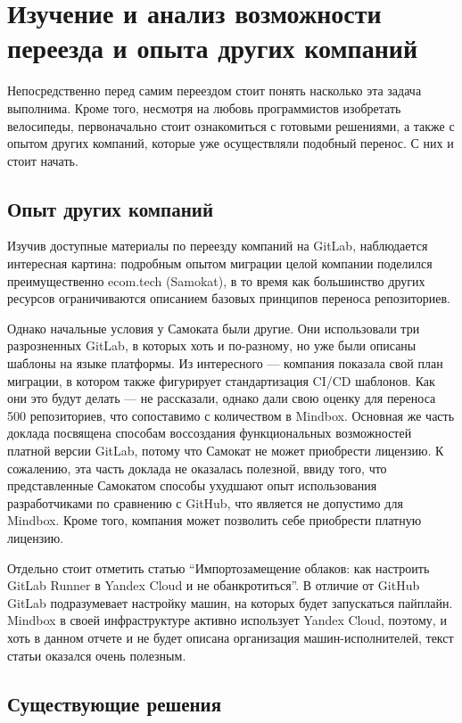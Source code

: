 \chapter{Изучение и анализ возможности переезда и опыта других компаний} \label{ch:ch1}
Непосредственно перед самим переездом стоит понять насколько эта задача выполнима.
Кроме того, несмотря на любовь программистов изобретать велосипеды,
первоначально стоит ознакомиться с готовыми решениями, а также с опытом других компаний,
которые уже осуществляли подобный перенос.
С них и стоит начать.


\section{Опыт других компаний}\label{sec:other-companies-expirience}
Изучив доступные материалы по переезду компаний на GitLab,
наблюдается интересная картина: подробным опытом миграции целой компании поделился преимущественно ecom.tech (Samokat),
в то время как большинство других ресурсов ограничиваются описанием базовых принципов переноса репозиториев.

Однако начальные условия у Самоката были другие.
Они использовали три разрозненных GitLab, в которых хоть и по-разному, но уже были описаны шаблоны на языке платформы.
Из интересного — компания показала свой план миграции, в котором также фигурирует стандартизация CI/CD шаблонов.
Как они это будут делать — не рассказали, однако дали свою оценку для переноса 500 репозиториев, что сопоставимо с количеством в Mindbox.
Основная же часть доклада посвящена способам воссоздания функциональных возможностей платной версии GitLab, потому что
Самокат не может приобрести лицензию.
К сожалению, эта часть доклада не оказалась полезной,
ввиду того, что представленные Самокатом способы ухудшают опыт использования разработчиками по сравнению с GitHub,
что является не допустимо для Mindbox.
Кроме того, компания может позволить себе приобрести платную лицензию.

Отдельно стоит отметить статью \enquote{Импортозамещение облаков: как настроить GitLab Runner в Yandex Cloud и не обанкротиться}.
В отличие от GitHub GitLab подразумевает настройку машин, на которых будет запускаться пайплайн.
Mindbox в своей инфраструктуре активно использует Yandex Cloud, поэтому, и хоть в данном отчете и не будет описана организация машин-исполнителей,
текст статьи оказался очень полезным.

\section{Существующие решения}\label{sec:existing-solutions}
